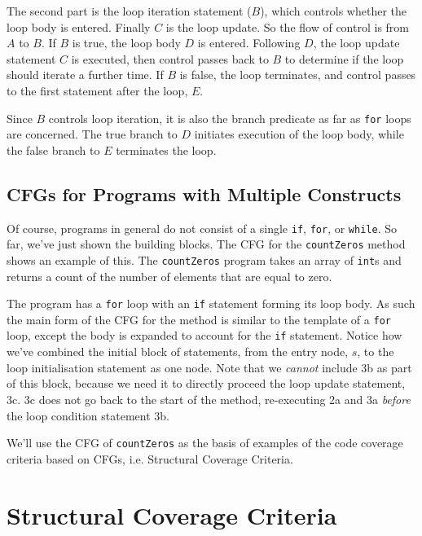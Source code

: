 
The second part is the loop iteration statement ($B$), which controls whether
the loop body is entered. Finally $C$ is the loop update. So the flow of control
is from $A$ to $B$. If $B$ is true, the loop body $D$ is entered. Following $D$,
the loop update statement $C$ is executed, then control passes back to $B$ to
determine if the loop should iterate a further time. If $B$ is false, the loop
terminates, and control passes to the first statement after the loop, $E$. 

Since $B$ controls loop iteration, it is also the branch predicate as far as
{\tt for} loops are concerned. The true branch to $D$ initiates execution of the
loop body, while the false branch to $E$ terminates the loop.


\subsection{CFGs for Programs with Multiple Constructs}

Of course, programs in general do not consist of a single {\tt if}, {\tt for},
or {\tt while}. So far, we've just shown the building blocks. The CFG for the
{\tt countZeros} method shows an example of this. The {\tt countZeros} program
takes an array of {\tt int}s and returns a count of the number of elements that
are equal to zero.


The program has a {\tt for} loop with an {\tt if} statement forming its loop
body. As such the main form of the CFG for the method is similar to the template
of a {\tt for} loop, except the body is expanded to account for the {\tt if}
statement. Notice how we've combined the initial block of statements, from the
entry node, $s$, to the loop initialisation statement as one node. Note that we
{\it cannot} include 3b as part of this block, because we need it to directly
proceed the loop update statement, 3c. 3c does not go back to the start of the
method, re-executing 2a and 3a {\it before} the loop condition statement 3b.

We'll use the CFG of {\tt countZeros} as the basis of examples of the code
coverage criteria based on CFGs, i.e. Structural Coverage Criteria.


\section{Structural Coverage Criteria}

